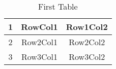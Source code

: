 
	\begin{table}[ht]
		\centering
		\begin{tabular}{|c|c|c|}
		\hline
		\hline
		1 & RowCol1 & Row1Col2 \\
		\hline
		2 & Row2Col1 & Row2Col2 \\
		\hline
		3 & Row3Col1 & Row3Col2 \\
		\hline
		\end{tabular}
		\caption{First Table}
		\label{tab:firstTable}
	\end{table}